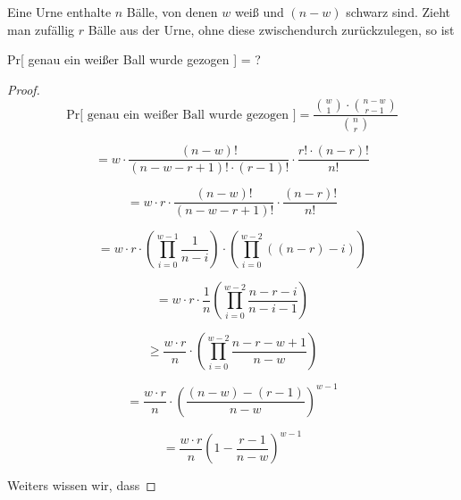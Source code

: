 \documentclass{article}
\begin{document}
Eine Urne enthalte $n$ B{\"a}lle, von denen $w$ wei{\ss} und $(n - w)$ schwarz sind.
Zieht man zuf{\"a}llig $r$ B{\"a}lle aus der Urne, ohne diese zwischendurch
zur{\"u}ckzulegen, so ist
\begin{center}
  Pr[ genau ein wei{\ss}er Ball wurde gezogen ] = ?
\end{center}

\begin{proof}
  \begin{equation}
    \text{Pr[ genau ein wei{\ss}er Ball wurde gezogen ]}
      = \frac{\binom{w}{1} \cdot \binom{n - w}{r - 1}}{\binom{n}{r}}
  \end{equation}

  \begin{equation}
    = w \cdot \frac{(n - w)!}{(n - w - r + 1)! \cdot (r - 1)!} \cdot \frac{r! \cdot (n - r)!}{n!}
  \end{equation}

  \begin{equation}
    = w \cdot r \cdot \frac{(n - w)!}{(n - w - r + 1)!} \cdot \frac{(n - r)!}{n!}
  \end{equation}

  \begin{equation}
    = w \cdot r \cdot \left( \prod\limits_{i = 0}^{w - 1} \frac{1}{n - i} \right) \cdot \left( \prod\limits_{i = 0}^{w - 2} \left( \left( n - r \right) - i \right) \right)
  \end{equation}

  \begin{equation}
    = w \cdot r \cdot \frac{1}{n} \left( \prod\limits_{i = 0}^{w - 2} \frac{n - r - i}{n - i - 1} \right)
  \end{equation}

  \begin{equation}
    \geq \frac{w \cdot r}{n} \cdot \left( \prod\limits_{i = 0}^{w - 2} \frac{n - r - w + 1}{n - w} \right)
  \end{equation}

  \begin{equation}
    = \frac{w \cdot r}{n} \cdot \left( \frac{\left( n - w \right) - \left( r - 1 \right)}{n - w} \right)^{w - 1}
  \end{equation}

  \begin{equation}
    = \frac{w \cdot r}{n} \left( 1 - \frac{r - 1}{n - w} \right)^{w - 1}
  \end{equation}
   
  \bigskip
  \noindent
  Weiters wissen wir, dass


\end{proof}
\end{document}
